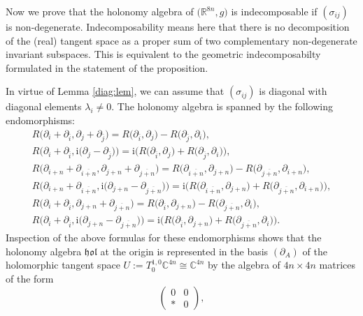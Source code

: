 \documentclass[11pt]{article}
\numberwithin{equation}{section}
\numberwithin{equation}{section}
\newcommand{\C}{\ensuremath{\mathbb{C}}}
\newcommand{\1}{\mathbf{1}}
\newcommand{\+}{\oplus}
\renewcommand{\=}{\equiv}
\newcommand{\R}{\mathbb{R}}
\begin{document}
Now we prove that the holonomy algebra of $\bigl(\R^{8n},g\bigr)$ is indecomposable if $(\sigma_{ij})$ is non-degenerate.
Indecomposability means here that there is no decomposition of the (real) tangent space as a proper sum of two complementary non-degenerate invariant subspaces. This is equivalent to the geometric indecomposabilty formulated in the statement of the proposition.

In virtue of Lemma \ref{diag:lem}, we can assume that $(\sigma_{ij})$ is diagonal
with diagonal elements $\lambda_i\neq 0$.
The holonomy algebra is spanned by the following endomorphisms:
\begin{gather*}
R\bigl(\partial_i + \partial_{\bar i},\partial_j+\partial_{\bar j}\bigr) = R\bigl(\partial_{\bar i}, \partial_j\bigr) - R\bigl(\partial_{\bar j}, \partial_i\bigr),\\
R\bigl(\partial_i + \partial_{\bar i},\mathrm{i}\bigl(\partial_j-\partial_{\bar j}\bigr)\bigr) = \mathrm{i}\bigl(R\bigl(\partial_{\bar i}, \partial_j\bigr) +
R\bigl(\partial_{\bar j}, \partial_i\bigr)\bigr),\\
R\bigl(\partial_{i+n} + \partial_{\overline{i+n}},\partial_{j+n}+\partial_{\overline{j+n}}\bigr) = R\bigl(\partial_{\overline{i+n}}, \partial_{j+n}\bigr) - R\bigl(\partial_{\overline{j+n}}, \partial_{i+n}\bigr),\\
R\bigl(\partial_{i+n} + \partial_{\overline{i+n}},\mathrm{i}\bigl(\partial_{j+n}-\partial_{\overline{j+n}}\bigr)\bigr) = \mathrm{i}\bigl(R\bigl(\partial_{\overline{i+n}}, \partial_{j+n}\bigr) + R\bigl(\partial_{\overline{j+n}}, \partial_{i+n}\bigr)\bigr),\\
R\bigl(\partial_{i} + \partial_{\overline{i}},\partial_{j+n}+\partial_{\overline{j+n}}\bigr) = R\bigl(\partial_{\overline{i}}, \partial_{j+n}\bigr) - R\bigl(\partial_{\overline{j+n}}, \partial_{i}\bigr),\\
R\bigl(\partial_{i} + \partial_{\overline{i}},\mathrm{i}\bigl(\partial_{j+n}-\partial_{\overline{j+n}}\bigr)\bigr) = \mathrm{i}\bigl(R\bigl(\partial_{\overline{i}}, \partial_{j+n}\bigr) + R\bigl(\partial_{\overline{j+n}}, \partial_{i}\bigr)\bigr).
\end{gather*}
Inspection of the above formulas for these endomorphisms shows that the holonomy algebra $\mathfrak{hol}$ at the origin is represented
in the basis $(\partial_A)$ of the holomorphic tangent space ${U\!:=\!T_0^{1,0}\C^{4n}\cong \C^{4n}}$ by the algebra of $4n \times 4n$ matrices of the form
\[ \begin{pmatrix}0&0\\\ast &0\end{pmatrix},\]
\end{document}
